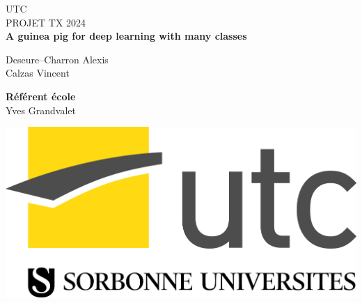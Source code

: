 \documentclass[12pt,english, openany]{book}
\begin{document}


\begin{titlepage}
	\clearpage\thispagestyle{empty}
	\centering
	\vspace{1cm}

	{\normalsize UTC \\ 
		PROJET TX 2024}
 \\
		
		\vspace{3cm}
	{\Huge \textbf{A guinea pig for deep learning with many classes}} \\

	\vspace{3cm}
	{\normalsize Deseure--Charron Alexis \\ Calzas Vincent \\ \par}
	\vspace{0.7cm}
 
    { \textbf{Référent école}} \\
    {Yves Grandvalet}
    \vspace{4.5cm}

    
    \centering 
    \includegraphics[scale=0.07]{images/UTC-SU.jpg}

	\pagebreak

\end{titlepage}

\tableofcontents{}

\newcommand{\hiddensubsection}[1]{
    \stepcounter{subsection}
    \subsection*{\hspace{1em}{#1}}
}
\end{document}

